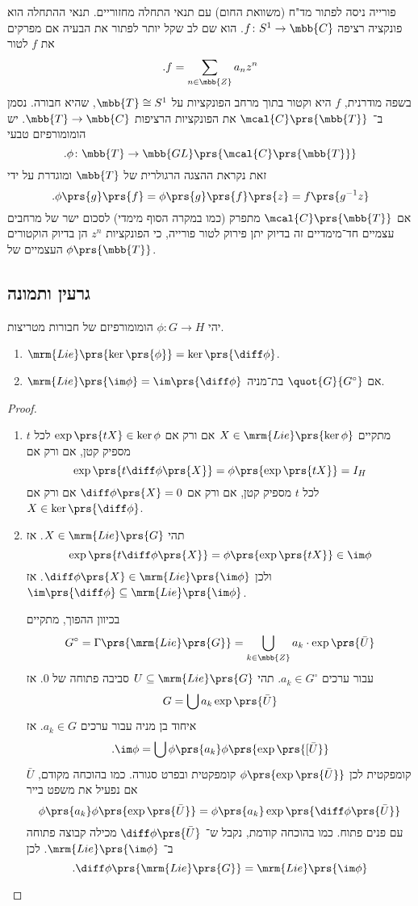 \documentclass[10pt, twoside]{book}
\newcommand{\Lie}{\mrm{Lie}}
\begin{document}
פורייה ניסה לפתור מד"ח (משוואת החום) עם תנאי התחלה מחזוריים.
תנאי ההתחלה הוא פונקציה רציפה
$f \colon S^1 \to \mbb{C}$.
הוא שם לב שקל יותר לפתור את הבעיה אם מפרקים את
$f$
לטור
\[\text{.} f = \sum_{n \in \mbb{Z}} a_n z^n\]
בשפה מודרנית,
$f$
היא וקטור בתוך מרחב הפונקציות על
$\mbb{T} \cong S^1$,
שהיא חבורה.
נסמן ב־%
$\mcal{C}\prs{\mbb{T}}$
את הפונקציות הרציפות
$\mbb{T} \to \mbb{C}$.
יש הומומורפיזם טבעי
\[\text{.} \phi \colon \mbb{T} \to \mbb{GL}\prs{\mcal{C}\prs{\mbb{T}}}\]
זאת נקראת ההצגה הרגולרית של
$\mbb{T}$
ומוגדרת על ידי
\[\text{.} \phi\prs{g}\prs{f} = \phi\prs{g}\prs{f}\prs{z} = f\prs{g^{-1} z}\]
אם
$\mcal{C}\prs{\mbb{T}}$
מתפרק (כמו במקרה הסוף מימדי) לסכום ישר של מרחבים עצמיים חד־מימדיים זה בדיוק יתן פירוק לטור פורייה, כי הפונקציות
$z^n$
הן בדיוק הוקטורים העצמיים של
$\phi\prs{\mbb{T}}$.

\subsection{גרעין ותמונה}

\begin{proposition}
יהי
$\phi \colon G \to H$
הומומורפיזם של חבורות מטריצות.
\begin{enumerate}
\item $\Lie\prs{\ker\prs{\phi}} = \ker \prs{\diff \phi}$.
\item $\Lie\prs{\im \phi} = \im\prs{\diff \phi}$
אם
$\quot{G}{G^\circ}$
בת־מניה.
\end{enumerate}
\end{proposition}

\begin{proof}
\begin{enumerate}
\item מתקיים
$X \in \Lie\prs{\ker \phi}$
אם ורק אם
$\exp\prs{tX} \in \ker \phi$
לכל
$t$
מספיק קטן, אם ורק אם
\[\exp\prs{t \diff \phi\prs{X}} = \phi\prs{\exp\prs{tX}} = I_H\]
לכל
$t$
מספיק קטן, אם ורק אם
$\diff \phi\prs{X} = 0$
אם ורק אם
$X \in \ker \prs{\diff \phi}$.
\item תהי
$X \in \Lie\prs{G}$.
אז
\[\exp\prs{t \diff \phi\prs{X}} = \phi\prs{\exp \prs{tX}} \in \im \phi\]
ולכן
$\diff \phi\prs{X} \in \Lie\prs{\im \phi}$.
אז
$\im\prs{\diff \phi} \subseteq \Lie\prs{\im \phi}$.

בכיוון ההפוך, מתקיים
\[G^\circ = \Gamma\prs{\Lie\prs{G}} = \bigcup_{k \in \mbb{Z}} a_k \cdot \exp\prs{\bar{U}}\]
עבור ערכים
$a_k \in G^\circ$.
תהי
$U \subseteq \Lie\prs{G}$
סביבה פתוחה של
$0$.
אז
\[G = \bigcup a_k \exp\prs{\bar{U}}\]
איחוד בן מניה עבור ערכים
$a_k \in G$.
אז
\[\text{.}\im \phi = \bigcup \phi\prs{a_k} \phi\prs{\exp\prs{[\bar{U}}}\]
$\bar{U}$
קומפקטית לכן
$\phi\prs{\exp\prs{\bar{U}}}$
קומפקטית ובפרט סגורה.
כמו בהוכחה מקודם, אם נפעיל את משפט בייר
\[\phi\prs{a_k} \phi\prs{\exp\prs{\bar{U}}} = \phi\prs{a_k} \exp\prs{\diff \phi\prs{\bar{U}}}\]
עם פנים פתוח.
כמו בהוכחה קודמת, נקבל ש־%
$\diff \phi\prs{\bar{U}}$
מכילה קבוצה פתוחה ב־%
$\Lie\prs{\im \phi}$.
לכן
\[\text{.} \diff \phi\prs{\Lie\prs{G}} = \Lie\prs{\im \phi}\]
\end{enumerate}
\end{proof}
\end{document}
